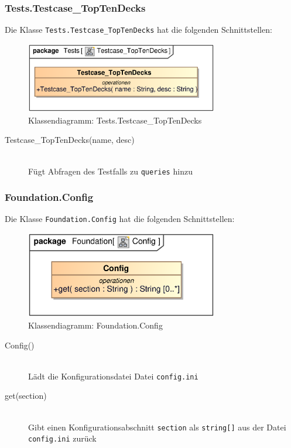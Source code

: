 \subsubsection{Tests.Testcase\_TopTenDecks}
Die Klasse \verb|Tests.Testcase_TopTenDecks| hat die folgenden Schnittstellen:
\begin{figure}[H]
    \myfloatalign
    \includegraphics[width=0.75\textwidth]{gfx/MtGDeepAnalysis/Testcase_TopTenDecks.eps}
    \caption{Klassendiagramm: Tests.Testcase\_TopTenDecks}
    \label{fig:class:tests.Testcase_TopTenDecks}
\end{figure}
\begin{description}
    \item[Testcase\_TopTenDecks(name, desc)] \hfill \\
    Fügt Abfragen des Testfalls zu \verb|queries| hinzu
\end{description}

\subsubsection{Foundation.Config}
Die Klasse \verb|Foundation.Config| hat die folgenden Schnittstellen:
\begin{figure}[H]
    \myfloatalign
    \includegraphics[width=0.75\textwidth]{gfx/MtGDeepAnalysis/Config.eps}
    \caption{Klassendiagramm: Foundation.Config}
    \label{fig:class:foundation.config}
\end{figure}
\begin{description}
    \item[Config()] \hfill \\
    Lädt die Konfigurationsdatei Datei \verb|config.ini|
    
    \item[get(section)] \hfill \\
    Gibt einen Konfigurationsabschnitt \verb|section| als \verb|string[]| aus der Datei \verb|config.ini| zurück
\end{description}



